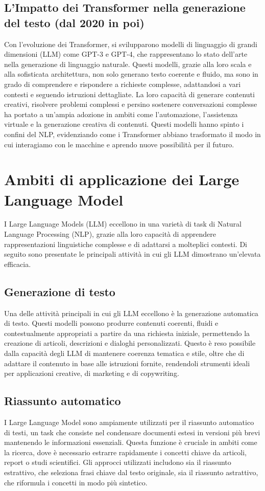 \documentclass[target=mst,aauheader=,style=]{thud}
\begin{document}
\subsection{L’Impatto dei Transformer nella generazione del testo (dal 2020 in poi)}
Con l’evoluzione dei Transformer, si svilupparono modelli di linguaggio di grandi dimensioni (LLM) come GPT-3 e GPT-4, che rappresentano lo stato dell’arte nella generazione di linguaggio naturale. Questi modelli, grazie alla loro scala e alla sofisticata architettura, non solo generano testo coerente e fluido, ma sono in grado di comprendere e rispondere a richieste complesse, adattandosi a vari contesti e seguendo istruzioni dettagliate. La loro capacità di generare contenuti creativi, risolvere problemi complessi e persino sostenere conversazioni complesse ha portato a un’ampia adozione in ambiti come l’automazione, l’assistenza virtuale e la generazione creativa di contenuti. Questi modelli hanno spinto i confini del NLP, evidenziando come i Transformer abbiano trasformato il modo in cui interagiamo con le macchine e aprendo nuove possibilità per il futuro.

\section{Ambiti di applicazione dei Large Language Model}
I Large Language Models (LLM) eccellono in una varietà di task di Natural Language Processing (NLP), grazie alla loro capacità di apprendere rappresentazioni linguistiche complesse e di adattarsi a molteplici contesti. Di seguito sono presentate le principali attività in cui gli LLM dimostrano un'elevata efficacia.

\subsection{Generazione di testo}
Una delle attività principali in cui gli LLM eccellono è la generazione automatica di testo. Questi modelli possono produrre contenuti coerenti, fluidi e contestualmente appropriati a partire da una richiesta iniziale, permettendo la creazione di articoli, descrizioni e dialoghi personalizzati. Questo è reso possibile dalla capacità degli LLM di mantenere coerenza tematica e stile, oltre che di adattare il contenuto in base alle istruzioni fornite, rendendoli strumenti ideali per applicazioni creative, di marketing e di copywriting.

\subsection{Riassunto automatico}
I Large Language Model sono ampiamente utilizzati per il riassunto automatico di testi, un task che consiste nel condensare documenti estesi in versioni più brevi mantenendo le informazioni essenziali. Questa funzione è cruciale in ambiti come la ricerca, dove è necessario estrarre rapidamente i concetti chiave da articoli, report o studi scientifici. Gli approcci utilizzati includono sia il riassunto estrattivo, che seleziona frasi chiave dal testo originale, sia il riassunto astrattivo, che riformula i concetti in modo più sintetico.
\end{document}
